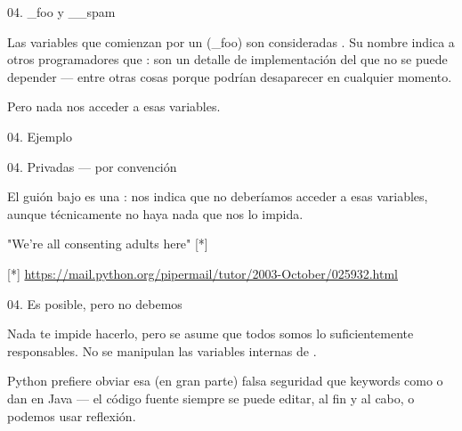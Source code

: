 
\begin{frame}{04. \_foo y \_\_spam}

  \begin{center}
    \small
    \centering
    Las variables que comienzan por un  (\_foo)
    son consideradas .  Su nombre indica a otros
    programadores que : son un detalle de
    implementación del que no se puede depender — entre otras cosas
    porque podrían desaparecer en cualquier momento.
  \end{center}

  \begin{block}{}
    \large
    Pero nada nos  acceder a esas variables.
  \end{block}
\end{frame}

\begin{frame}{04. Ejemplo}
  \small
\end{frame}

\begin{frame}{04. Privadas — por convención}
  \begin{alertblock}{}
    \small
    \centering
    El guión bajo es una : nos indica que no
    deberíamos acceder a esas variables, aunque técnicamente no haya
    nada que nos lo impida.
  \end{alertblock}

  \begin{center}
    \large
    "We're all consenting adults here" [*]
    \end{center}

  \begin{center}
    \scriptsize
        [*] \url{https://mail.python.org/pipermail/tutor/2003-October/025932.html}
  \end{center}
\end{frame}

\begin{frame}{04. Es posible, pero no debemos}
  \begin{alertblock}{}
    \centering
    Nada te impide hacerlo, pero se asume que todos somos lo
    suficientemente responsables. No se manipulan las variables
    internas de .
  \end{alertblock}

  \begin{center}
    \small
    Python prefiere obviar esa (en gran parte) falsa seguridad que
    keywords como  o  dan en
    Java — el código fuente siempre se puede editar, al fin y al cabo,
    o podemos usar reflexión.
  \end{center}
\end{frame}

